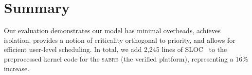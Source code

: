 \section{Summary}

Our evaluation demonstrates our model has minimal overheads, achieves isolation,  provides a notion
of criticality orthogonal to priority, and allows for efficient user-level scheduling.
In total, we add 2,245 lines of SLOC~\citep{Wheeler_01} to the preprocessed kernel code for the \textsc{sabre}
(the verified platform), representing a 16\% increase.

